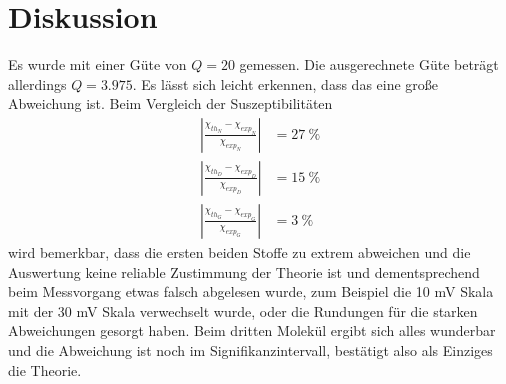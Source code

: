 \section{Diskussion}
\label{sec:Diskussion}

Es wurde mit einer Güte von $Q=20$ gemessen. Die ausgerechnete Güte beträgt allerdings $Q=3.975$. Es lässt sich leicht erkennen, dass das eine große Abweichung ist. 
Beim Vergleich der Suszeptibilitäten 
\begin{align*}
  |\frac{\chi_{th_{N}}-\chi_{exp_{N}}}{\chi_{exp_{N}}}|&=27\ \%\\
  |\frac{\chi_{th_{D}}-\chi_{exp_{D}}}{\chi_{exp_{D}}}|&=15\ \%\\
  |\frac{\chi_{th_{G}}-\chi_{exp_{G}}}{\chi_{exp_{G}}}|&=3\ \%
\end{align*}
wird bemerkbar, dass die ersten beiden Stoffe zu extrem abweichen und die Auswertung keine reliable Zustimmung der Theorie ist und dementsprechend beim Messvorgang etwas falsch abgelesen wurde, zum Beispiel die 10 mV Skala mit der 30 mV Skala verwechselt wurde, oder die Rundungen für die starken Abweichungen gesorgt haben. Beim dritten Molekül ergibt sich alles wunderbar und die Abweichung ist noch im Signifikanzintervall, bestätigt also als Einziges die Theorie. 
